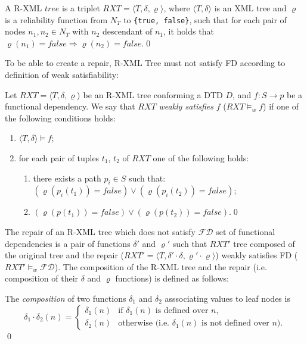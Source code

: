 \begin{define}\label{rxmlTree}
A R-XML $tree$ is a triplet $RXT = \langle T, \delta, \varrho \rangle$, where $\langle T, \delta \rangle$ is an XML tree and $\varrho$ is a reliability function from $N_T$ to \texttt{\{true, false\}}, such that for each pair of nodes $n_1 , n_2 \in N_T$ with $n_2$ descendant of $n_1$, it holds that $\varrho(n_1) = false \Rightarrow \varrho(n_2) = false$.\qed
\end{define}

To be able to create a repair, R-XML Tree must not satisfy FD according to definition of weak satisfiability:

\begin{define}\label{weakSatisf}
Let $RXT = \langle T, \delta, \varrho \rangle$ be an R-XML tree conforming a DTD $D$, and $f: S \rightarrow p$ be a functional dependency. We say that $RXT$ {\sl weakly satisfies} $f$ ($RXT \models_w f$) if one of the following conditions holds:
\begin{enumerate}
	\item $\langle T, \delta \rangle \models f$;
    \item for each pair of tuples $t_1$, $t_2$ of $RXT$ one of the following holds:
    \begin{enumerate}
    	\item there exists a path $p_i \in S$ such that: \\
$(\varrho(p_i(t_1)) = false) \lor (\varrho(p_i(t_2)) = false)$;
        \item $(\varrho(p(t_1)) = false) \lor (\varrho(p(t_2)) = false)$.\qed
    \end{enumerate}
\end{enumerate}
\end{define}

The repair of an R-XML tree which does not satisfy $\mathcal{FD}$ set of functional dependencies is a pair of functions $\delta'$ and $\varrho'$ such that $RXT'$ tree composed of the original tree and the repair ($RXT' = \langle T, \delta' \cdot \delta, \varrho' \cdot \varrho \rangle$) weakly satisfies FD ($RXT' \models_w \mathcal{FD}$). The composition of the R-XML tree and the repair (i.e. composition of their $\delta$ and $\varrho$ functions) is defined as follows:

\begin{define}\label{compDelta}
The {\sl composition} of two functions $\delta_1$ and $\delta_2$ asssociating values to leaf nodes is
\begin{displaymath}
    \delta_1 \cdot \delta_2(n) =
        \begin{cases}
            \delta_1(n) & \text{if $\delta_1(n)$ is defined over $n$,}\\
            \delta_2(n) & \text{otherwise (i.e. $\delta_1(n)$ is not defined over $n$).}
        \end{cases}
\end{displaymath}\qed
\end{define}

